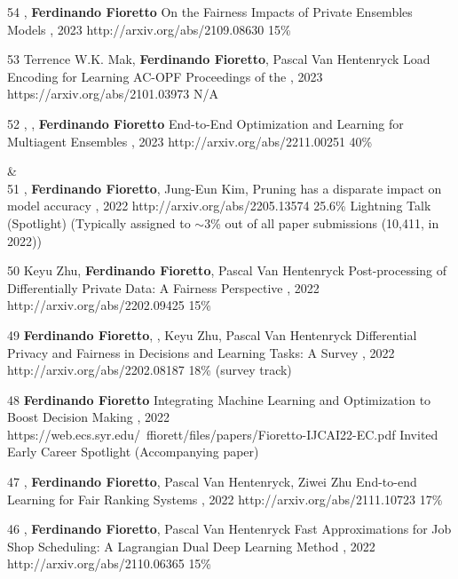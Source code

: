 \begin{pubs}
\confentry
    {54} %
	{, {\bf Ferdinando Fioretto}}
	{On the Fairness Impacts of Private Ensembles Models}
    {\procIJCAI, 2023}
	{http://arxiv.org/abs/2109.08630}
    {15\%}

\confentry
	{53} %
	{Terrence W.K. Mak, {\bf Ferdinando Fioretto}, Pascal Van Hentenryck}
	{Load Encoding for Learning AC-OPF}
	{Proceedings of the , 2023}
	{https://arxiv.org/abs/2101.03973}
	{N/A}

\confentry
    {52} %
	{, , {\bf Ferdinando Fioretto}}
	{End-to-End Optimization and Learning for Multiagent Ensembles}
    {\procAAMAS, 2023}
	{http://arxiv.org/abs/2211.00251}
    {40\%}

{}&\nemph{\rule{0.5\linewidth}{0.5pt}}\\[1em]

\confentryAwd
	{51} %
	{, {\bf Ferdinando Fioretto}, Jung-Eun Kim, }
	{Pruning has a disparate impact on model accuracy}
	{\procNeurIPS, 2022}
	{http://arxiv.org/abs/2205.13574}
	{25.6\%}
	{Lightning Talk (Spotlight)}
	{(Typically assigned to $\sim$3\% out of all paper submissions (10,411, in 2022))}

	\confentry
	{50} %
	{Keyu Zhu, {\bf Ferdinando Fioretto}, Pascal Van Hentenryck}
	{Post-processing of Differentially Private Data: A Fairness Perspective}
	{\procIJCAI, 2022}
	{http://arxiv.org/abs/2202.09425}	
	{15\%}

	\confentry
	{49} %
	{{\bf Ferdinando Fioretto}, , Keyu Zhu, Pascal Van Hentenryck}
	{Differential Privacy and Fairness in Decisions and Learning Tasks: A Survey}
	{\procIJCAI, 2022}
	{http://arxiv.org/abs/2202.08187}	
	{18\% (survey track)}

	\confentryAwd
	{48} %
	{{\bf Ferdinando Fioretto}}
	{Integrating Machine Learning and Optimization to Boost Decision Making}
	{\procIJCAI, 2022}
	{https://web.ecs.syr.edu/~ffiorett/files/papers/Fioretto-IJCAI22-EC.pdf}	
	{Invited}
	{Early Career Spotlight}
	{(Accompanying paper)}

	\confentry
	{47} %
	{, {\bf Ferdinando Fioretto}, Pascal Van Hentenryck, Ziwei Zhu}
	{End-to-end Learning for Fair Ranking Systems}
	{\procWWW, 2022}
	{http://arxiv.org/abs/2111.10723}	
	{17\%}
	
	\confentry
	{46} %
	{, {\bf Ferdinando Fioretto}, Pascal Van Hentenryck}
	{Fast Approximations for Job Shop Scheduling: A Lagrangian Dual Deep Learning Method}
	{\procAAAI, 2022}
	{http://arxiv.org/abs/2110.06365}
	{15\%}


\end{pubs}
